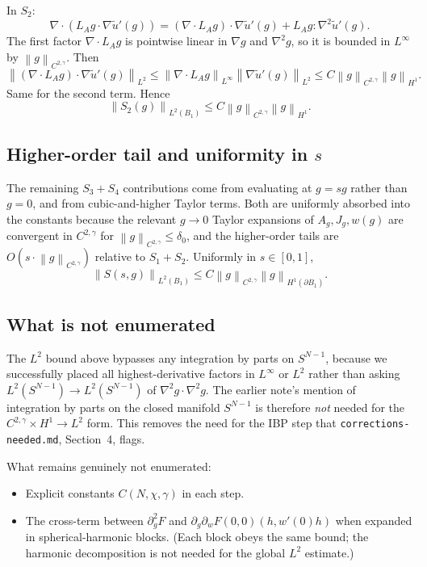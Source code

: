 \documentclass[11pt]{article}
\theoremstyle{definition}
\newcommand{\norm}[1]{\left\|#1\right\|}
\begin{document}
In $S_2$:
\[
\nabla\cdot(L_Ag\cdot\nabla\widetilde u'(g))
=(\nabla\cdot L_Ag)\cdot\nabla\widetilde u'(g)+L_Ag:\nabla^2\widetilde u'(g).
\]
The first factor $\nabla\cdot L_Ag$ is pointwise linear in $\nabla g$ and
$\nabla^2 g$, so it is bounded in $L^\infty$ by
$\norm{g}_{C^{2,\gamma}}$. Then
\[
\norm{(\nabla\cdot L_Ag)\cdot\nabla\widetilde u'(g)}_{L^2}
\le\norm{\nabla\cdot L_Ag}_{L^\infty}\norm{\nabla\widetilde u'(g)}_{L^2}
\le C\norm{g}_{C^{2,\gamma}}\norm{g}_{H^1}.
\]
Same for the second term. Hence
\[
\norm{S_2(g)}_{L^2(B_1)}\le C\norm{g}_{C^{2,\gamma}}\norm{g}_{H^1}.
\]

\subsection{Higher-order tail and uniformity in $s$}

The remaining $S_3+S_4$ contributions come from evaluating at $g=sg$ rather
than $g=0$, and from cubic-and-higher Taylor terms. Both are uniformly
absorbed into the constants because the relevant $g\to0$ Taylor expansions
of $A_g, J_g, w(g)$ are convergent in $C^{2,\gamma}$ for
$\norm{g}_{C^{2,\gamma}}\le\delta_0$, and the higher-order tails are
$O(s\cdot\norm{g}_{C^{2,\gamma}})$ relative to $S_1+S_2$. Uniformly in
$s\in[0,1]$,
\[
\norm{S(s,g)}_{L^2(B_1)}\le C\norm{g}_{C^{2,\gamma}}\norm{g}_{H^1(\partial B_1)}.
\]

\subsection{What is not enumerated}

The $L^2$ bound above bypasses any integration by parts on $S^{N-1}$,
because we successfully placed all highest-derivative factors in $L^\infty$
or $L^2$ rather than asking $L^2(S^{N-1})\to L^2(S^{N-1})$ of
$\nabla^2g\cdot\nabla^2g$. The earlier note's mention of integration by
parts on the closed manifold $S^{N-1}$ is therefore \emph{not} needed for
the $C^{2,\gamma}\times H^1\to L^2$ form. This removes the need for the
IBP step that \texttt{corrections-needed.md}, Section~4, flags.

What remains genuinely not enumerated:
\begin{itemize}
\item Explicit constants $C(N,\chi,\gamma)$ in each step.
\item The cross-term between $\partial_g^2 F$ and $\partial_g\partial_w F(0,0)(h, w'(0)h)$
when expanded in spherical-harmonic blocks. (Each block obeys the same bound;
the harmonic decomposition is not needed for the global $L^2$ estimate.)
\end{itemize}
\end{document}
